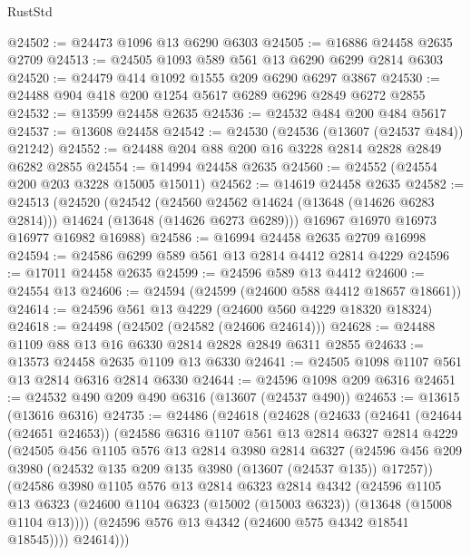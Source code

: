 \begin{lexlean}{RustStd}
\begin{coremodule}
@24502 := @24473 @1096 @13 @6290 @6303
@24505 := @16886 @24458 @2635 @2709
@24513 := @24505 @1093 @589 @561 @13 @6290 @6299 @2814 @6303
@24520 := @24479 @414 @1092 @1555 @209 @6290 @6297 @3867
@24530 := @24488 @904 @418 @200 @1254 @5617 @6289 @6296 @2849 @6272 @2855
@24532 := @13599 @24458 @2635
@24536 := @24532 @484 @200 @484 @5617
@24537 := @13608 @24458
@24542 := @24530 (@24536 (@13607 (@24537 @484)) @21242)
@24552 := @24488 @204 @88 @200 @16 @3228 @2814 @2828 @2849 @6282 @2855
@24554 := @14994 @24458 @2635
@24560 := @24552 (@24554 @200 @203 @3228 @15005 @15011)
@24562 := @14619 @24458 @2635
@24582 := @24513
    (@24520
      (@24542
        (@24560 @24562 @14624 (@13648 (@14626 @6283 @2814)))
        @14624
        (@13648 (@14626 @6273 @6289)))
      @16967
      @16970
      @16973
      @16977
      @16982
      @16988)
@24586 := @16994 @24458 @2635 @2709 @16998
@24594 := @24586 @6299 @589 @561 @13 @2814 @4412 @2814 @4229
@24596 := @17011 @24458 @2635
@24599 := @24596 @589 @13 @4412
@24600 := @24554 @13
@24606 := @24594 (@24599 (@24600 @588 @4412 @18657 @18661))
@24614 := @24596 @561 @13 @4229 (@24600 @560 @4229 @18320 @18324)
@24618 := @24498 (@24502 (@24582 (@24606 @24614)))
@24628 := @24488 @1109 @88 @13 @16 @6330 @2814 @2828 @2849 @6311 @2855
@24633 := @13573 @24458 @2635 @1109 @13 @6330
@24641 := @24505 @1098 @1107 @561 @13 @2814 @6316 @2814 @6330
@24644 := @24596 @1098 @209 @6316
@24651 := @24532 @490 @209 @490 @6316 (@13607 (@24537 @490))
@24653 := @13615 (@13616 @6316)
@24735 := @24486
    (@24618
      (@24628
        (@24633
          (@24641
            (@24644 (@24651 @24653))
            (@24586
              @6316
              @1107
              @561
              @13
              @2814
              @6327
              @2814
              @4229
              (@24505
                @456
                @1105
                @576
                @13
                @2814
                @3980
                @2814
                @6327
                (@24596 @456 @209 @3980 (@24532 @135 @209 @135 @3980 (@13607 (@24537 @135)) @17257))
                (@24586
                  @3980
                  @1105
                  @576
                  @13
                  @2814
                  @6323
                  @2814
                  @4342
                  (@24596
                    @1105
                    @13
                    @6323
                    (@24600 @1104 @6323 (@15002 (@15003 @6323)) (@13648 (@15008 @1104 @13))))
                  (@24596 @576 @13 @4342 (@24600 @575 @4342 @18541 @18545))))
              @24614)))

\end{coremodule}
\end{lexlean}
